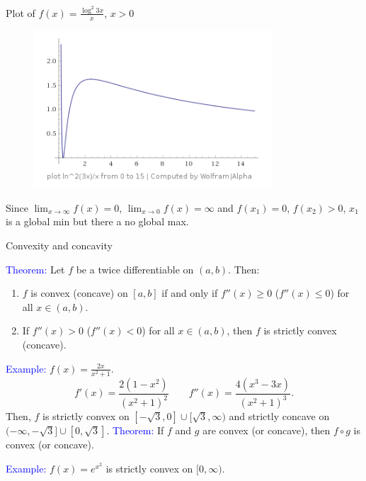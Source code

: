 \documentclass[11pt,aspectratio=169]{beamer}
\begin{document}
\begin{frame}{Plot of $f(x)=\frac{\log^2 3x}{x}$, $x>0$}

\begin{figure}
\includegraphics[width=3.5in]{img/ima} 
\end{figure}
Since $\lim_{x \rightarrow \infty} f(x)=0$, $\lim_{x \rightarrow 0} f(x)=\infty$
and $f(x_1)=0$, $f(x_2)>0$, $x_1$ is a global min but there a no global max.
\end{frame}



\begin{frame}{Convexity and concavity}

 \textcolor{blue}{Theorem:} Let $f$ be a twice differentiable on $(a,b)$. Then:
\begin{enumerate}
\item $f$ is convex (concave) on $[a,b]$ if and only if $f''(x)\geq 0$  ($f''(x)\leq 0$) for all $x \in (a,b)$.
\item If $f''(x)> 0$ ($f''(x)< 0$) for all $x \in (a,b)$, then $f$ is strictly convex (concave).
\end{enumerate}



 \textcolor{blue}{Example:} $f(x)=\frac{2x}{x^2+1}$.
$$
f'(x)=\frac{2(1-x^2)}{(x^2+1)^2}\qquad f''(x)=\frac{4(x^3-3x)}{(x^2+1)^3}.
$$
Then, $f$ is strictly convex on $[-\sqrt{3},0] \cup [\sqrt{3}, \infty)$ and strictly concave on $(-\infty, -\sqrt{3}] \cup [0, \sqrt{3}]$.
 \vskip 11pt
 \textcolor{blue}{Theorem:} If $f$ and $g$ are convex (or concave), then $f \circ g$ is convex (or concave).
 
\textcolor{blue}{Example:} $f(x)=e^{x^2}$ is strictly convex on $[0, \infty)$.
\end{frame}
\end{document}
